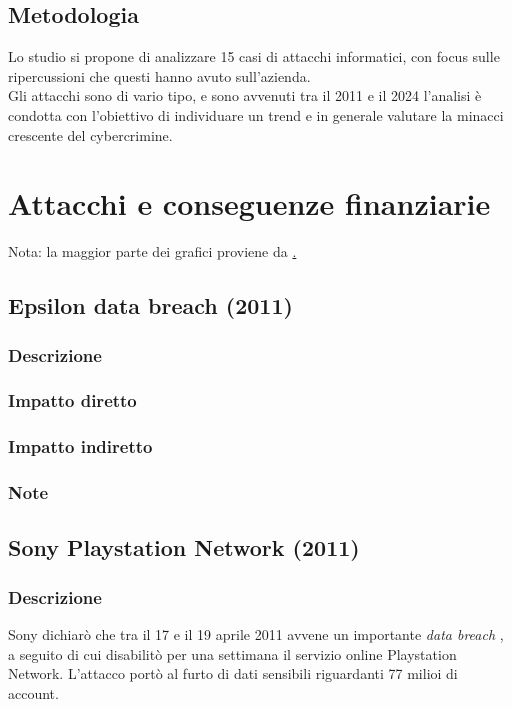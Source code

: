 \documentclass[12pt,a4paper,openright,twoside]{report}
\begin{document}
\section{Metodologia}
Lo studio si propone di analizzare 15 casi di attacchi informatici, con focus sulle ripercussioni che questi hanno avuto sull'azienda.\\
Gli attacchi sono di vario tipo, e sono avvenuti tra il 2011 e il 2024 l'analisi \`e condotta con l'obiettivo di individuare un trend e in generale valutare la minacci crescente del cybercrimine.\\  
\clearpage{\pagestyle{empty}\cleardoublepage}



\chapter{Attacchi e conseguenze finanziarie}
Nota: la maggior parte dei grafici proviene da \href{https://www.macrotrends.net/}.
\section{Epsilon data breach (2011)}
\subsection{Descrizione}

\subsection{Impatto diretto}

\subsection{Impatto indiretto}

\subsection{Note}
\section{Sony Playstation Network (2011)}
\subsection{Descrizione}
Sony dichiar\`o che tra il 17 e il 19 aprile 2011 avvene un importante \textit{data breach} , a seguito di cui disabilit\`o per una settimana il servizio online Playstation Network. L'attacco port\`o al furto di dati sensibili riguardanti 77 milioi di account\cite{Sony_PNT_guardian}\cite{Sony_pnt}.\\
\end{document}
